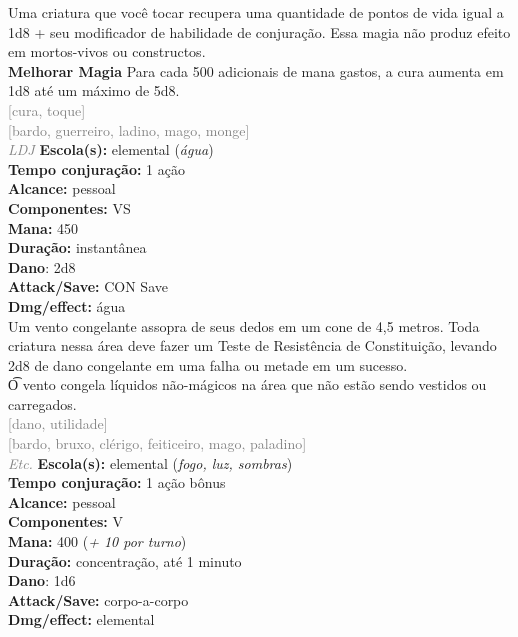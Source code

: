 \documentclass{RPG_Adventure}[2021/10/20]
\begin{document}
{\normalsize Uma criatura que você tocar recupera uma quantidade de pontos de vida igual a 1d8 + seu modificador de habilidade de conjuração. Essa magia não produz efeito em mortos-vivos ou constructos.\\\t \textbf{Melhorar Magia} Para cada 500 adicionais de mana gastos, a cura aumenta em 1d8 até um máximo de 5d8.\\}
{\scriptsize \textcolor{gray}{[cura, toque]\\}}
{\scriptsize \textcolor{gray}{[bardo, guerreiro, ladino, mago, monge]\\}}
{\tiny \textcolor{gray}{\textit{LDJ}}}
{\small \t \textbf{Escola(s):} elemental (\textit{água})\\\t \textbf{Tempo conjuração:} 1 ação\\\t \textbf{Alcance:} pessoal\\\t \textbf{Componentes:} VS\\\t \textbf{Mana:} 450\\\t \textbf{Duração:} instantânea\\\t \textbf{Dano}: 2d8\\\t \textbf{Attack/Save:} CON Save\\\t \textbf{Dmg/effect:} água\\}
{\normalsize Um vento congelante assopra de seus dedos em um cone de 4,5 metros. Toda criatura nessa área deve fazer um Teste de Resistência de Constituição, levando 2d8 de dano congelante em uma falha ou metade em um sucesso.\\\t O vento congela líquidos não-mágicos na área que não estão sendo vestidos ou carregados.\\}
{\scriptsize \textcolor{gray}{[dano, utilidade]\\}}
{\scriptsize \textcolor{gray}{[bardo, bruxo, clérigo, feiticeiro, mago, paladino]\\}}
{\tiny \textcolor{gray}{\textit{Etc.}}}
{\small \t \textbf{Escola(s):} elemental (\textit{fogo, luz, sombras})\\\t \textbf{Tempo conjuração:} 1 ação bônus\\\t \textbf{Alcance:} pessoal\\\t \textbf{Componentes:} V\\\t \textbf{Mana:} 400 (\textit{+ 10 por turno})\\\t \textbf{Duração:} concentração, até 1 minuto\\\t \textbf{Dano}: 1d6\\\t \textbf{Attack/Save:} corpo-a-corpo\\\t \textbf{Dmg/effect:} elemental\\}
\end{document}
